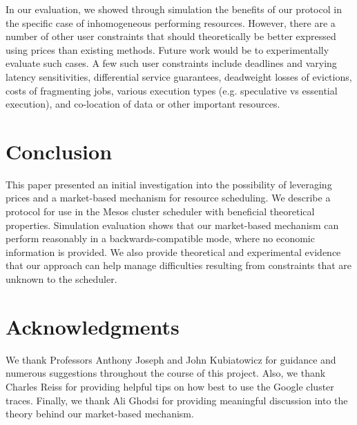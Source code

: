 \documentclass{acm_proc_article-sp}
\begin{document}
In our evaluation, we showed through simulation the benefits of our protocol in the specific case of inhomogeneous performing resources. However, there are a number of other user constraints that should theoretically be better expressed using prices than existing methods. Future work would be to experimentally evaluate such cases. A few such user constraints include deadlines and varying latency sensitivities, differential service guarantees, deadweight losses of evictions, costs of fragmenting jobs, various execution types (e.g. speculative vs essential execution), and co-location of data or other important resources.

\section{Conclusion}
\label{sec:conclusion}

This paper presented an initial investigation into the possibility of leveraging prices and a market-based mechanism for resource scheduling. We describe a protocol for use in the Mesos cluster scheduler with beneficial theoretical properties. Simulation evaluation shows that our market-based mechanism can perform reasonably in a backwards-compatible mode, where no economic information is provided. 
We also provide theoretical and experimental evidence that our approach can help manage difficulties
resulting from constraints that are unknown to the scheduler.

\section{Acknowledgments}

We thank Professors Anthony Joseph and John Kubiatowicz for guidance and numerous suggestions throughout the course of this project. Also, we thank Charles Reiss for providing helpful tips on how best to use the Google cluster traces. Finally, we thank Ali Ghodsi for providing meaningful discussion into the theory behind our market-based mechanism.
\end{document}
